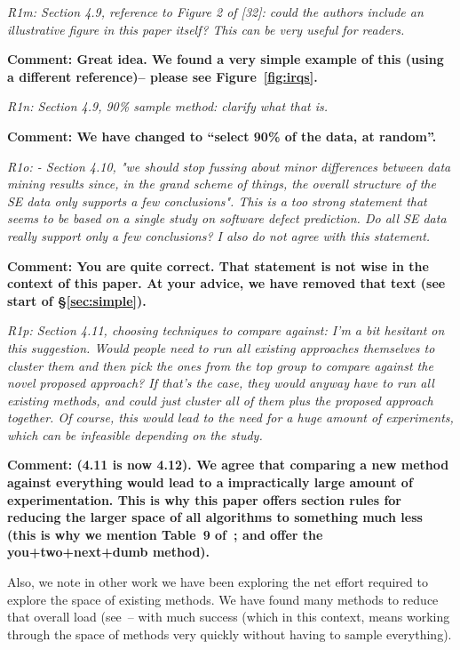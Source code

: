 {\em R1m: Section 4.9, reference to Figure 2 of [32]: could the authors include an illustrative figure in this paper itself? This can be very useful for readers.}

{\bf Comment: Great idea. We found  a very simple example of this (using a different reference)--  please see Figure~\ref{fig:irqs}.}


{\em R1n:  Section 4.9, 90\% sample method: clarify what that is.}

{\bf Comment:   We have changed to
``select
 90\% of the data, at random''.}


{\em R1o: - Section 4.10, "we should stop fussing about minor differences between data mining results since, in the grand scheme of things, the overall structure of the SE data only supports a few conclusions". This is a too strong statement that seems to be based on a single study on software defect prediction. Do all SE data really support only a few conclusions? I also do not agree with this statement.}

{\bf Comment:   You are quite correct. That statement is not wise in the context
of this paper. At your advice, we have removed that text (see start of \S\vref{sec:simple}).
}

{\em R1p:  Section 4.11, choosing techniques to compare against: I'm a bit hesitant on this suggestion. Would people need to run all existing approaches themselves to cluster them and then pick the ones from the top group to compare against the novel proposed approach? If that's the case, they would anyway have to run all existing methods, and could just cluster all of them plus the proposed approach together. Of course, this would lead to the need for a huge amount of experiments, which can be infeasible depending on the study.}

{\bf Comment: (4.11 is now 4.12). We agree that comparing a new method against 
everything would lead to a impractically large amount of experimentation.
This is why this paper offers section rules for reducing the larger space of 
all algorithms to something much less (this is why we  mention
Table~9 of~\cite{ghotra2015}; and offer the you+two+next+dumb method).

Also, we note in other work we have been exploring the net effort required
to explore the space of existing methods. We have found many methods to reduce
that overall load (see~\cite{Fu16,chen2018,AgrawalM17}-- with much success
(which in this context, means working through the space of methods
very quickly without having to sample everything).
}



